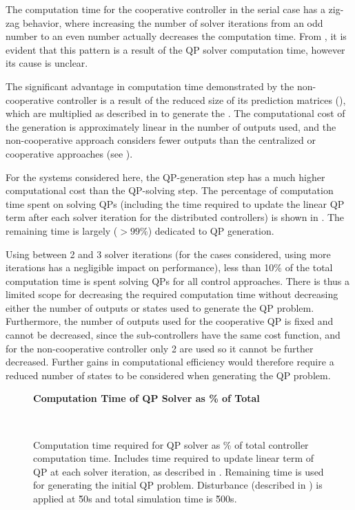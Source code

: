The computation time for the cooperative controller in the serial case has a zig-zag behavior, where increasing the number of solver iterations from an odd number to an even number actually decreases the computation time.
From , it is evident that this pattern is a result of the QP solver computation time, however its cause is unclear.

The significant advantage in computation time demonstrated by the non-cooperative controller is a result of the reduced size of its prediction matrices (), which are multiplied as described in  to generate the .
The computational cost of the  generation is approximately linear in the number of outputs used, and the non-cooperative approach considers fewer outputs than the centralized or cooperative approaches (see ).

For the systems considered here, the QP-generation step has a much higher computational cost than the QP-solving step.
The percentage of computation time spent on solving QPs (including the time required to update the linear QP term after each solver iteration for the distributed controllers) is shown in .
The remaining time is largely ($>99\%$) dedicated to QP generation.

Using between 2 and 3 solver iterations (for the cases considered, using more iterations has a negligible impact on performance), less than 10\% of the total computation time is spent solving QPs for all control approaches. 
There is thus a limited scope for decreasing the required computation time without decreasing either the number of outputs or states used to generate the QP problem.
Furthermore, the number of outputs used for the cooperative QP is fixed and cannot be decreased, since the sub-controllers have the same cost function, and for the non-cooperative controller only 2 are used so it cannot be further decreased.
Further gains in computational efficiency would therefore require a reduced number of states to be considered when generating the QP problem.

\ifmakeplots
\begin{figure}
  \centering
  {\large\bfseries Computation Time of QP Solver as \% of Total\\}
  \begin{subfigure}{0.75\linewidth}
  
  \end{subfigure}
  \\
  \begin{subfigure}{0.75\linewidth}
  
  \end{subfigure}
  \caption{Computation time required for QP solver as \% of total controller computation time. Includes time required to update linear term of QP at each solver iteration, as described in . Remaining time is used for generating the initial QP problem. Disturbance (described in ) is applied at \u{50}{s} and total simulation time is \u{500}{s}.}
  \label{fig:res:qp-compcost}
\end{figure}
\fi

